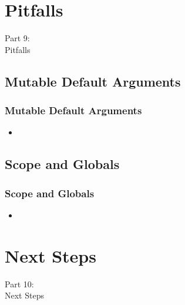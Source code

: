 
\section{Pitfalls}
\begin{frame}
    \vspace{25mm}
    \begin{center}
        \Huge{Part 9:\\Pitfalls}
    \end{center}
\end{frame}

\subsection{Mutable Default Arguments}
\begin{frame}
    \frametitle{Mutable Default Arguments}
    \vspace{5mm}
    
    \begin{itemize}
      \item 
    \end{itemize}
\end{frame}

\subsection{Scope and Globals}
\begin{frame}
    \frametitle{Scope and Globals}
    \vspace{5mm}
    
    \begin{itemize}
      \item 
    \end{itemize}
\end{frame}


\section{Next Steps}
\begin{frame}
    \vspace{25mm}
    \begin{center}
        \Huge{Part 10:\\Next Steps}
    \end{center}
\end{frame}

